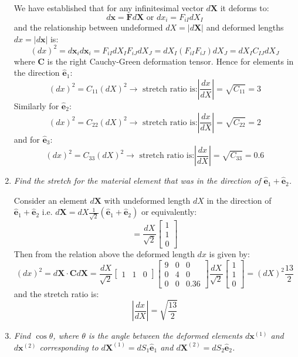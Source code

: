 \documentclass{article}
\newcommand{\ee}{\end{equation}}
\newcommand{\be}{\begin{equation}}
\newcommand{\bs}{\boldsymbol}
\begin{document}
\begin{enumerate}
We have established that for any infinitesimal vector $d\bs{X}$ it deforms to:
\be
d\bs{x}=\bs{F}d\bs{X} \textrm{ or } dx_i=F_{iI}dX_I
\ee
and the relationship between undeformed $dX=|d\bs{X}|$ and deformed lengths $dx=|d\bs{x}|$ is:
\be
(dx)^2=d\bs{x}_i d\bs{x}_i=F_{iI}dX_I F_{iJ}dX_J=dX_I (F_{iI} F_{iJ}) dX_J=dX_I C_{IJ} dX_J
\ee
where $\bs{C}$ is the right Cauchy-Green deformation tensor. Hence for elements in the direction $\bs{\hat{e}}_1$:
\be
 (dx)^2=C_{11}(dX)^2 \to \textrm{ stretch ratio is:} |\frac{dx}{dX}|=\sqrt{C_{11}}=3
\ee
Similarly for $\bs{\hat{e}}_2$:
\be
 (dx)^2=C_{22}(dX)^2 \to \textrm{ stretch ratio is:} |\frac{dx}{dX}|=\sqrt{C_{22}}=2
\ee
and for $\bs{\hat{e}}_3$:
\be
 (dx)^2=C_{33}(dX)^2 \to \textrm{ stretch ratio is:} |\frac{dx}{dX}|=\sqrt{C_{33}}=0.6
\ee

\item  {\em Find the stretch for the material element that was in the direction of $\bs{\hat{e}}_1+\bs{\hat{e}}_2$.}

Consider an element $d\bs{X}$ with undeformed length $d{X}$ in the direction of $\bs{\hat{e}}_1+\bs{\hat{e}}_2$ i.e. $d\bs{X}=d{X}\frac{1}{\sqrt{2}} (\bs{\hat{e}}_1+\bs{\hat{e}}_2)$ or equivalently:
\be
[d\bs{X}]=\frac{dX}{\sqrt{2}} \left[ \begin{array}{l} 1 \\1 \\ 0 \end{array}\right]
\ee
Then from the relation above the deformed length $dx$ is given by:
\be
(dx)^2=d\bs{X}\cdot \bs{C} d\bs{X}=\frac{dX}{\sqrt{2}} \left[ \begin{array}{lll} 1 &1 & 0 \end{array}\right] \left[ \begin{array}{ccc} 9 &0 &0 \\ 0 & 4 & 0 \\ 0 & 0 & 0.36 \end{array} \right] \frac{dX}{\sqrt{2}} \left[ \begin{array}{l} 1 \\1 \\ 0 \end{array}\right]=(dX)^2\frac{13}{2}
\ee
and the stretch ratio is:
\be
|\frac{dx}{dX}|=\sqrt{\frac{13}{2}}
\ee



\item  {\em Find $\cos \theta$, where $\theta$ is the angle between the deformed elements $d\bs{x}^{(1)}$ and $d\bs{x}^{(2)}$ corresponding to  $d\bs{X}^{(1)}=dS_1 \bs{\hat{e}}_1$ and
 $d\bs{X}^{(2)}=dS_2 \bs{\hat{e}}_2$.}


\end{enumerate}
\end{document}
